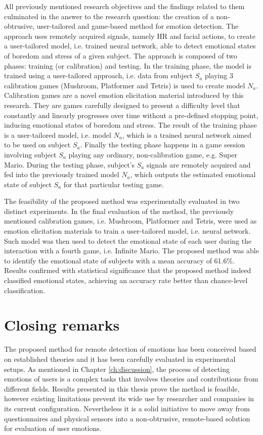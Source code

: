 All previously mentioned research objectives and the findings related to them culminated in the answer to the research question: the creation of a non-obtrusive, user-tailored and game-based method for emotion detection. The approach uses remotely acquired signals, namely HR and facial actions, to create a user-tailored model, i.e. trained neural network, able to detect emotional states of boredom and stress of a given subject. The approach is composed of two phases: training (or calibration) and testing. In the training phase, the model is trained using a user-tailored approach, i.e. data from subject $S_a$ playing 3 calibration games (Mushroom, Platformer and Tetris) is used to create model $N_a$. Calibration games are a novel emotion elicitation material introduced by this research. They are games carefully designed to present a difficulty level that constantly and linearly progresses over time without a pre-defined stopping point, inducing emotional states of boredom and stress. The result of the training phase is a user-tailored model, i.e. model $N_a$, which is a trained neural network aimed to be used on subject $S_a$. Finally the testing phase happens in a game session involving subject $S_a$ playing any ordinary, non-calibration game, e.g. Super Mario. During the testing phase, subject's $S_a$ signals are remotely acquired and fed into the previously trained model $N_a$, which outputs the estimated emotional state of subject $S_a$ for that particular testing game.

The feasibility of the proposed method was experimentally evaluated in two distinct experiments. In the final evaluation of the method, the previously mentioned calibration games, i.e. Mushroom, Platformer and Tetris, were used as emotion elicitation materials to train a user-tailored model, i.e. neural network. Such model was then used to detect the emotional state of each user during the interaction with a fourth game, i.e. Infinite Mario. The proposed method was able to identify the emotional state of subjects with a mean accuracy of 61.6\%. Results confirmed with statistical significance that the proposed method indeed classified emotional states, achieving an accuracy rate better than chance-level classification.

\section{Closing remarks}

The proposed method for remote detection of emotions has been conceived based on established theories and it has been carefully evaluated in experimental setups. As mentioned in Chapter \ref{ch:discussion}, the process of detecting emotions of users is a complex tasks that involves theories and contributions from different fields. Results presented in this thesis prove the method is feasible, however existing limitations prevent its wide use by researcher and companies in its current configuration. Nevertheless it is a solid initiative to move away from questionnaires and physical sensors into a non-obtrusive, remote-based solution for evaluation of user emotions.

